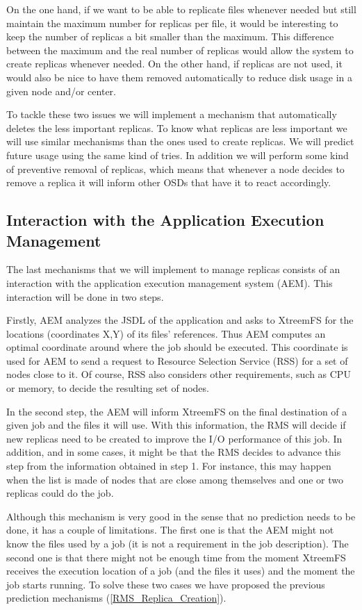 On the one hand, if we want to be able to replicate files whenever needed but
still maintain the maximum number for replicas per file, it would be interesting
to keep the number of replicas a bit smaller than the maximum. This difference
between the maximum and the real number of replicas would allow the system to
create replicas whenever needed. On the other hand, if replicas are not used, it
would also be nice to have them removed automatically to reduce disk usage in a
given node and/or center.

To tackle these two issues we will implement a mechanism that automatically
deletes the less important replicas. To know what replicas are less important we
will use similar mechanisms than the ones used to create replicas. We will
predict future usage using the same kind of tries. In addition we will perform
some kind of preventive removal of replicas, which means that whenever a node
decides to remove a replica it will inform other OSDs that have it to react
accordingly.


\subsection{Interaction with the Application Execution Management}
\label{RMS_AEM_interaction}

The last mechanisms that we will implement to manage replicas consists of an
interaction with the application execution management system (AEM). This
interaction will be done in two steps.

Firstly, AEM analyzes the JSDL of the application and asks to XtreemFS
for the locations (coordinates X,Y) of its files' references. Thus AEM computes
an optimal coordinate around where the job should be executed. This coordinate
is used for AEM to send a request to Resource Selection Service (RSS) for a set
of nodes close to it. Of course, RSS also considers other requirements, such as
CPU or memory, to decide the resulting set of nodes.

In the second step, the AEM will inform XtreemFS on the final destination of a
given job and the files it will use. With this information, the RMS will decide
if new replicas need to be created to improve the I/O performance of this job.
In addition, and in some cases, it might be that the RMS decides to advance this
step from the information obtained in step 1. For instance, this may happen when
the list is made of nodes that are close among themselves and one or two
replicas could do the job.

Although this mechanism is very good in the sense that no prediction needs to be
done, it has a couple of limitations. The first one is that the AEM might not
know the files used by a job (it is not a requirement in the job description).
The second one is that there might not be enough time from the moment XtreemFS
receives the execution location of a job (and the files it uses) and the moment
the job starts running. To solve these two cases we have proposed the previous
prediction mechanisms (\ref{RMS_Replica_Creation}).
